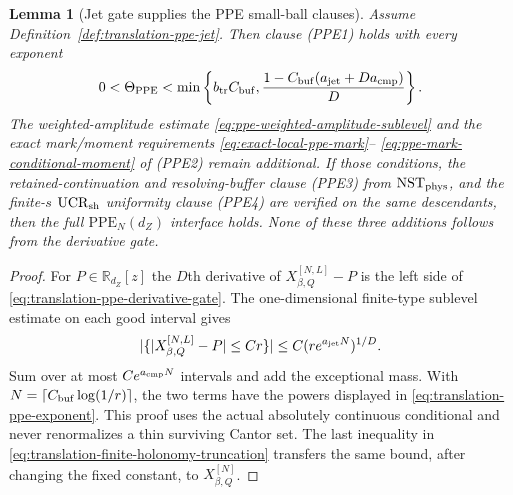 \documentclass[11pt]{article}
\newtheorem{lemma}[theorem]{Lemma}
\begin{document}
\begin{lemma}[Jet gate supplies the PPE small-ball clauses]
\label{lem:translation-jet-implies-ppe}
Assume Definition~\ref{def:translation-ppe-jet}.  Then clause
\textup{(PPE1)} holds with every exponent
\begin{equation}
\label{eq:translation-ppe-exponent}
 0<\Theta_{\rm PPE}<
 \min\left\{b_{\rm tr}C_{\rm buf},
 \frac{1-C_{\rm buf}(a_{\rm jet}+Da_{\rm cmp})}{D}\right\}.
\end{equation}
The weighted-amplitude estimate
\eqref{eq:ppe-weighted-amplitude-sublevel} and the exact mark/moment
requirements \eqref{eq:exact-local-ppe-mark}--
\eqref{eq:ppe-mark-conditional-moment} of \textup{(PPE2)} remain
additional.  If those conditions, the retained-continuation and resolving-buffer clause
\textup{(PPE3)} from $\mathrm{NST}_{\rm phys}$, and the finite-$s$
$\mathrm{UCR}_{\rm sh}$ uniformity clause \textup{(PPE4)} are verified on
the same descendants, then the full $\mathrm{PPE}_{N}(d_Z)$ interface
holds.  None of these three additions follows from the derivative gate.
\end{lemma}

\begin{proof}
For $P\in\mathbb R_{d_Z}[z]$ the $D$th derivative of
$X^{[N,L]}_{\beta,Q}-P$ is the left side of
\eqref{eq:translation-ppe-derivative-gate}.  The one-dimensional
finite-type sublevel estimate on each good interval gives
\[
 |\{|X^{[N,L]}_{\beta,Q}-P|\le Cr\}|
 \le C(r e^{a_{\rm jet}N})^{1/D}.
\]
Sum over at most $Ce^{a_{\rm cmp}N}$ intervals and add the exceptional
mass.  With $N=\lceil C_{\rm buf}\log(1/r)\rceil$, the two terms have the
powers displayed in \eqref{eq:translation-ppe-exponent}.  This proof uses
the actual absolutely continuous conditional and never renormalizes a thin
surviving Cantor set.  The last inequality in
\eqref{eq:translation-finite-holonomy-truncation} transfers the same bound,
after changing the fixed constant, to $X^{[N]}_{\beta,Q}$.
\end{proof}
\end{document}

